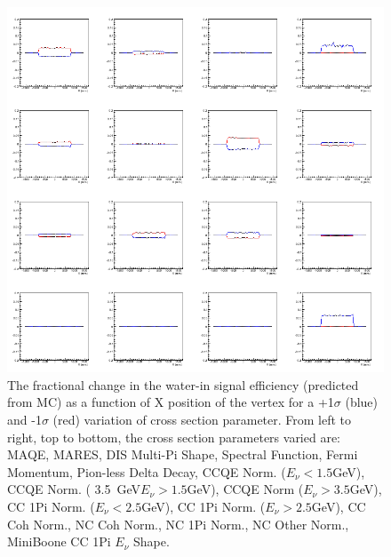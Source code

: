 \begin{figure}[H]
\centering
\includegraphics[width=5in]{Figures/TN100Plots/c_9_0.png}
\caption{The fractional change in the water-in signal efficiency (predicted from MC) as a function of X position of the vertex for a +1$\sigma$ (blue) and -1$\sigma$ (red) variation of cross section parameter. From left to right, top to bottom, the cross section parameters varied are: MAQE, MARES, DIS Multi-Pi Shape, Spectral Function, Fermi Momentum, Pion-less Delta Decay, CCQE Norm. ($E_\nu < 1.5$GeV), CCQE Norm. ( 3.5~GeV$E_\nu>1.5$GeV), CCQE Norm ($E_\nu > 3.5$GeV), CC 1Pi Norm. ($E_\nu < 2.5$GeV), CC 1Pi Norm. ($E_\nu > 2.5$GeV), CC Coh Norm., NC Coh Norm., NC 1Pi Norm., NC Other Norm., MiniBoone CC 1Pi $E_\nu$ Shape.}
\label{fig:xsvarXwE}
\end{figure}

